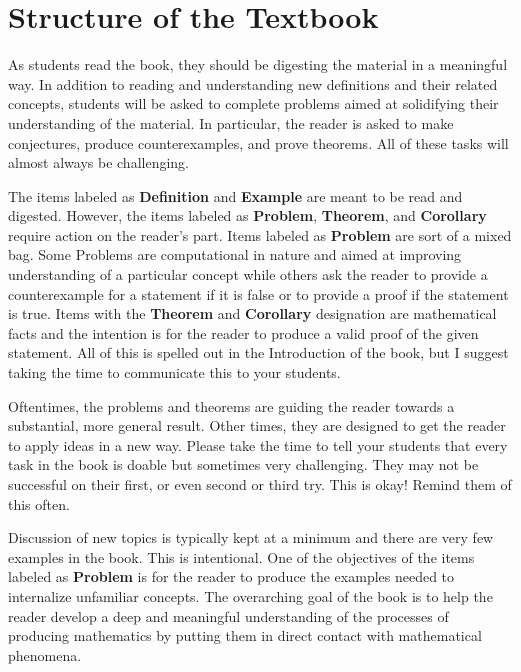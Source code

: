 \documentclass[11pt]{article}%
\newcommand{\blankline}{\pagebreak[2]\vspace{.5\baselineskip}}
\begin{document}
\section*{Structure of the Textbook}

As students read the book, they should be digesting the material in a meaningful way.  In addition to reading and understanding new definitions and their related concepts, students will be asked to complete problems aimed at solidifying their understanding of the material.  In particular, the reader is asked to make conjectures, produce counterexamples, and prove theorems. All of these tasks will almost always be challenging.

\blankline

The items labeled as \textbf{Definition} and \textbf{Example} are meant to be read and digested.  However, the items labeled as \textbf{Problem}, \textbf{Theorem}, and \textbf{Corollary} require action on the reader's part.  Items labeled as \textbf{Problem} are sort of a mixed bag. Some Problems are computational in nature and aimed at improving understanding of a particular concept while others ask the reader to provide a counterexample for a statement if it is false or to provide a proof if the statement is true. Items with the \textbf{Theorem} and \textbf{Corollary} designation are mathematical facts and the intention is for the reader to produce a valid proof of the given statement. All of this is spelled out in the Introduction of the book, but I suggest taking the time to communicate this to your students.

\blankline

Oftentimes, the problems and theorems are guiding the reader towards a substantial, more  general result. Other times, they are designed to get the reader to apply ideas in a new way. Please take the time to tell your students that every task in the book is doable but sometimes very challenging.  They may not be successful on their first, or even second or third try.  This is okay!  Remind them of this often. 

\blankline

Discussion of new topics is typically kept at a minimum and there are very few examples in the book. This is intentional.  One of the objectives of the items labeled as \textbf{Problem} is for the reader to produce the examples needed to internalize unfamiliar concepts.  The overarching goal of the book is to help the reader develop a deep and meaningful understanding of the processes of producing mathematics by putting them in direct contact with mathematical phenomena.
\end{document}
